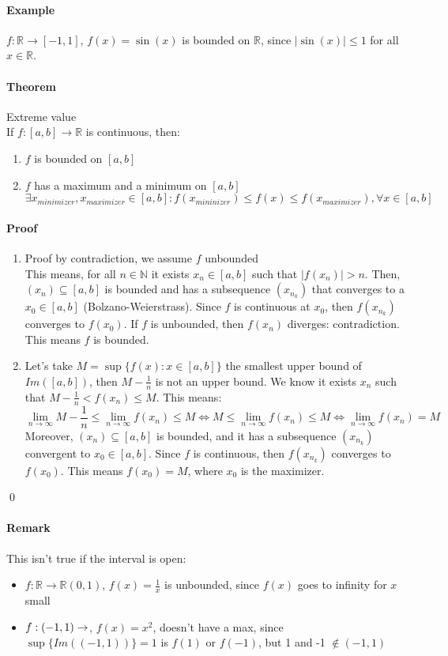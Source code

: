 \documentclass{article}
\newcommand{\abs}[1]{\left|#1\right|}
\newcommand{\func}[3]{#1 : #2 \rightarrow #3}
\newcommand{\functoR}[2]{#1 : #2 \rightarrow \mathbb{R}}
\newcommand{\funcR}[1]{#1 : \mathbb{R} \rightarrow \mathbb{R}}
\newcommand{\limn}{\lim_{n \to \infty}}
\newcommand{\intcc}[1]{\left[#1\right]}
\newcommand{\intoo}[1]{\left(#1\right)}
\newcommand{\N}{\mathbb{N}}
\newcommand{\R}{\mathbb{R}}
\newcommand{\Theorem}{\paragraph{Theorem}}
\newcommand{\Remark}{\paragraph{Remark}}
\newcommand{\Proof}{\paragraph{Proof}}
\newcommand{\Example}{\paragraph{Example}}
\begin{document}
	\Example $\func{f}{\R}{\intcc{-1,1}}$, $f(x) = \sin(x)$ is bounded on $\R$,
	since $\abs{\sin(x)} \leq 1$ for all $x \in \R$.

	\Theorem Extreme value
\\If $\functoR{f}{\intcc{a,b}}$ is continuous, then:
	\begin{enumerate}[label=(\roman*)]
		\item $f$ is bounded on $\intcc{a,b}$
		\item $f$ has a maximum and a minimum on $\intcc{a,b}$
	\\$\exists x_{minimizer}, x_{maximizer} \in \intcc{a,b} :
	f(x_{mininizer}) \leq f(x) \leq f(x_{maximizer}), \forall x \in \intcc{a,b}$
	\end{enumerate}

	\Proof
	\begin{enumerate}[label=(\roman*)]
		\item Proof by contradiction, we assume $f$ unbounded
	\\This means, for all $n \in \N$ it exists $x_n \in \intcc{a,b}$ such that
		$\abs{f(x_n)} > n$. Then, $(x_n) \subseteq \intcc{a,b}$ is bounded and has
		a subsequence $(x_{n_k})$ that converges to a $x_0 \in \intcc{a,b}$
		(Bolzano-Weierstrass). Since $f$ is continuous at $x_0$, then $f(x_{n_k})$
		converges to $f(x_0)$. If $f$ is unbounded, then $f(x_n)$ diverges:
		contradiction. This means $f$ is bounded.

		\item Let's take $M = \sup\{ f(x) : x \in \intcc{a,b} \}$ the smallest upper
		bound of $Im(\intcc{a,b})$, then $M - \frac{1}{n}$ is not an upper bound.
		We know it exists $x_n$ such that $M - \frac{1}{n} < f(x_n) \leq M$. This
		means:
		\begin{equation*}
			\limn{M - \frac{1}{n}} \leq \limn{f(x_n)} \leq M \iff
			M \leq \limn{f(x_n)} \leq M \iff \limn{f(x_n)} = M
		\end{equation*}
		Moreover, $(x_n) \subseteq \intcc{a,b}$ is bounded, and it has a subsequence
		$(x_{n_k})$ convergent to $x_0 \in \intcc{a,b}$. Since $f$ is continuous,
		then $f(x_{n_k})$ converges to $f(x_0)$. This means $f(x_0) = M$, where
		$x_0$ is the maximizer.
	\end{enumerate}
	\qed

	\Remark This isn't true if the interval is open:
	\begin{itemize}
		\item $\funcR{f}{\intoo{0,1}}$, $f(x) = \frac{1}{x}$ is unbounded, since
		$f(x)$ goes to infinity for $x$ small

		\item $\func{f}{\intoo{-1,1}}$, $f(x) = x^2$, doesn't have a max, since
		$\sup\{ Im(\intoo{-1,1}) \} = 1$ is $f(1)$ or $f(-1)$, but 1 and -1 $\notin
		\intoo{-1,1}$
	\end{itemize}
\end{document}
